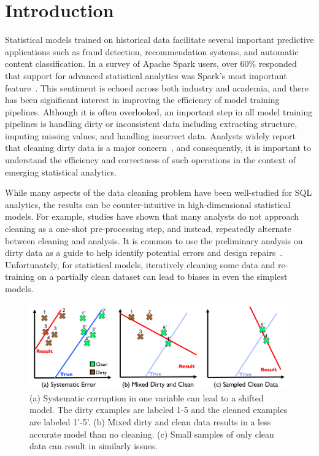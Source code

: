 \section{Introduction}\label{intro}
Statistical models trained on historical data facilitate several important predictive applications such as fraud detection, recommendation systems, and automatic content classification.
In a survey of Apache Spark users, over 60\% responded that support for advanced statistical analytics was Spark's most important feature~\cite{sparksurvey}.
This sentiment is echoed across both industry and academia, and there has been significant interest in improving the efficiency of model training pipelines. 
Although it is often overlooked, an important step in all model training pipelines is handling dirty or inconsistent data including extracting structure, imputing missing values, and handling incorrect data.
Analysts widely report that cleaning dirty data is a major concern~\cite{kandel2012}, and consequently, it is important to understand the efficiency and correctness of such operations in the context of emerging statistical analytics.

While many aspects of the data cleaning problem have been well-studied for SQL analytics, the results can be counter-intuitive in high-dimensional statistical models.
For example, studies have shown that many analysts do not approach cleaning as a one-shot pre-processing step, and instead, repeatedly alternate between cleaning and analysis.
It is common to use the preliminary analysis on dirty data as a guide to help identify potential errors and design repairs~\cite{fayyad1996data, kandel2012,krishnan2016hilda}.
Unfortunately, for statistical models, iteratively cleaning some data and re-training on a partially clean dataset can lead to biases in even the simplest models.

\begin{figure}[t]
\centering
 \includegraphics[width=\columnwidth]{figs/update-arch.png}
 \caption{(a) Systematic corruption in one variable can lead to a shifted model. The dirty examples are labeled 1-5 and the cleaned examples are labeled 1'-5'.
 (b) Mixed dirty and clean data results in a less accurate model than no cleaning.
(c) Small samples of only clean data can result in similarly issues. \label{update-arch1}}\vspace{-1em}
\end{figure}

